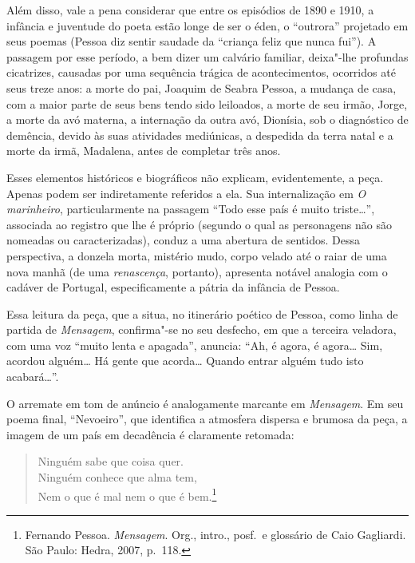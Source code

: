 Além disso, vale a pena considerar que
entre os episódios de 1890 e
1910, a infância e juventude do poeta estão longe de ser o éden, o
“outrora” projetado em seus poemas 
(Pessoa diz sentir saudade da
``criança feliz que nunca fui”). A passagem por
esse período, a bem dizer
um calvário familiar, deixa"-lhe profundas
cicatrizes, causadas por uma
sequência trágica de acontecimentos, ocorridos
até seus treze anos: a
morte do pai, Joaquim de Seabra Pessoa, 
a mudança de casa, com a maior
parte de seus bens tendo sido leiloados,
a morte de seu irmão, Jorge, a
morte da avó materna, a internação da outra avó, Dionísia, sob o
diagnóstico de demência, devido às suas atividades mediúnicas, 
a despedida da
terra natal e a morte da irmã, Madalena, 
antes de completar três anos.


Esses elementos históricos e biográficos não explicam,
evidentemente, a peça. Apenas podem ser
indiretamente referidos a ela.
Sua internalização em \textit{O
marinheiro}, particularmente na passagem “Todo esse
país é muito triste\ldots{}”, associada ao registro
que lhe é próprio
(segundo o qual as personagens não
são nomeadas ou caracterizadas),
conduz a uma abertura de sentidos.
Dessa perspectiva, a donzela morta,
mistério mudo, corpo velado até o raiar de uma nova manhã (de uma
\textit{renascença}, portanto),
apresenta notável analogia com o cadáver de 
Portugal, especificamente a
pátria da infância de Pessoa. 

Essa leitura da peça, que a situa, no itinerário
poético de Pessoa, como linha de partida de
\textit{Mensagem}, confirma"-se no
seu desfecho, em que a terceira
veladora, com uma voz “muito lenta e
apagada”, anuncia: “Ah, é agora, é
agora\ldots{} Sim, acordou alguém\ldots{} Há
gente que acorda\ldots{} Quando 
entrar alguém tudo isto acabará\ldots{}”. 

O arremate em tom de anúncio é analogamente marcante em
\textit{Mensagem}. Em seu poema final, “Nevoeiro”,
que identifica a
atmosfera dispersa e brumosa da peça,
a imagem de um país em decadência
é claramente retomada: 
\begin{hedraquote}
\begin{verse}
Ninguém sabe que coisa quer.\\
Ninguém conhece que alma tem,\\
Nem o que é mal nem o que é bem.\footnote{  Fernando Pessoa.
\textit{Mensagem}. Org., intro.,
posf.~e glossário de Caio
Gagliardi. São Paulo: Hedra, 2007, p.~118.}
\end{verse}
\end{hedraquote}


